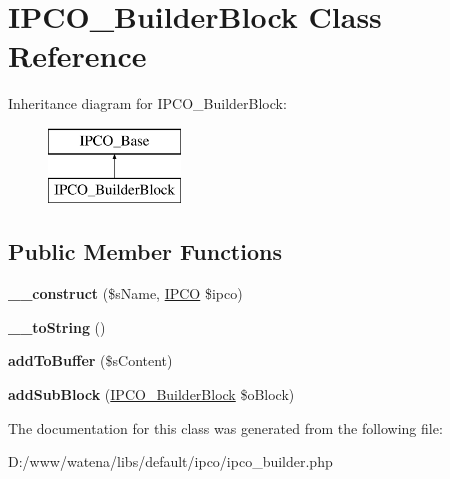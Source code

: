 \hypertarget{class_i_p_c_o___builder_block}{\section{I\-P\-C\-O\-\_\-\-Builder\-Block Class Reference}
\label{class_i_p_c_o___builder_block}
}
Inheritance diagram for I\-P\-C\-O\-\_\-\-Builder\-Block\-:\begin{figure}[H]
\begin{center}
\leavevmode
\includegraphics[height=2.000000cm]{class_i_p_c_o___builder_block}
\end{center}
\end{figure}
\subsection*{Public Member Functions}
\begin{DoxyCompactItemize}
\item 
\hypertarget{class_i_p_c_o___builder_block_a7f710f3768bcbbd8f78166af0320161c}{{\bfseries \-\_\-\-\_\-construct} (\$s\-Name, \hyperlink{class_i_p_c_o}{I\-P\-C\-O} \$ipco)}\label{class_i_p_c_o___builder_block_a7f710f3768bcbbd8f78166af0320161c}

\item 
\hypertarget{class_i_p_c_o___builder_block_ac978815fda8414f88af01106ac4a194b}{{\bfseries \-\_\-\-\_\-to\-String} ()}\label{class_i_p_c_o___builder_block_ac978815fda8414f88af01106ac4a194b}

\item 
\hypertarget{class_i_p_c_o___builder_block_a94503121514516e24606199b81d27d70}{{\bfseries add\-To\-Buffer} (\$s\-Content)}\label{class_i_p_c_o___builder_block_a94503121514516e24606199b81d27d70}

\item 
\hypertarget{class_i_p_c_o___builder_block_a8bf4c7d64815335c0d61accf149c9e4f}{{\bfseries add\-Sub\-Block} (\hyperlink{class_i_p_c_o___builder_block}{I\-P\-C\-O\-\_\-\-Builder\-Block} \$o\-Block)}\label{class_i_p_c_o___builder_block_a8bf4c7d64815335c0d61accf149c9e4f}

\end{DoxyCompactItemize}


The documentation for this class was generated from the following file\-:\begin{DoxyCompactItemize}
\item 
D\-:/www/watena/libs/default/ipco/ipco\-\_\-builder.\-php\end{DoxyCompactItemize}
